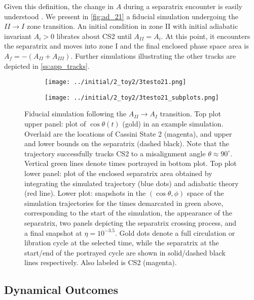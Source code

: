 \documentclass[
        fleqn,
        usenatbib,
    ]{mnras}
\newcommand*{\p}[1]{\left(#1\right)}
\begin{document}
Given this definition, the change in $A$ during a separatrix encounter is easily
understood \citep{henrard1982}. We present in \autoref{fig:ad_21} a fiducial
simulation undergoing the $II \to I$ zone transition. An initial condition in
zone II with initial adiabatic invariant $A_i > 0$ librates about CS2 until
$A_{II} = A_i$. At this point, it encounters the separatrix and moves into zone
I and the final enclosed phase space area is $A_f = -(A_{II} + A_{III})$.
Further simulations illustrating the other tracks are depicted in
\autoref{ss:app_tracks}.
\begin{figure}
    \centering
    \begin{subfigure}{\columnwidth}
        \centering
        \texttt{[image: ../initial/2\_toy2/3testo21.png]}
    \end{subfigure}
    \begin{subfigure}{\columnwidth}
        \centering
        \texttt{[image: ../initial/2\_toy2/3testo21\_subplots.png]}
    \end{subfigure}
    \caption{Fiducial simulation following the $A_{II} \to A_{I}$ transition. Top
    plot upper panel: plot of $\cos \theta(t)$ (gold) in an example simulation.
    Overlaid are the locations of Cassini State 2 (magenta), and upper and lower
    bounds on the separatrix (dashed black). Note that the trajectory
    successfully tracks CS2 to a misalignment angle $\theta \approx 90^\circ$.
    Vertical green lines denote times portrayed in bottom plot. Top plot lower
    panel: plot of the enclosed separatrix area obtained by integrating the
    simulated trajectory (blue dots) and adiabatic theory (red line). Lower
    plot: snapshots in the $\p{\cos \theta, \phi}$ space of the simulation
    trajectories for the times demarcated in green above, corresponding to the
    start of the simulation, the appearance of the separatrix, two panels
    depicting the separatrix crossing process, and a final snapshot at $\eta =
    10^{-3.5}$. Gold dots denote a full circulation or libration cycle at the
    selected time, while the separatrix at the start/end of the portrayed cycle
    are shown in solid/dashed black lines respectively. Also labeled is CS2
    (magenta).}\label{fig:ad_21}
\end{figure}

\subsection{Dynamical Outcomes}\label{ss:ad_ensemble}
\end{document}
